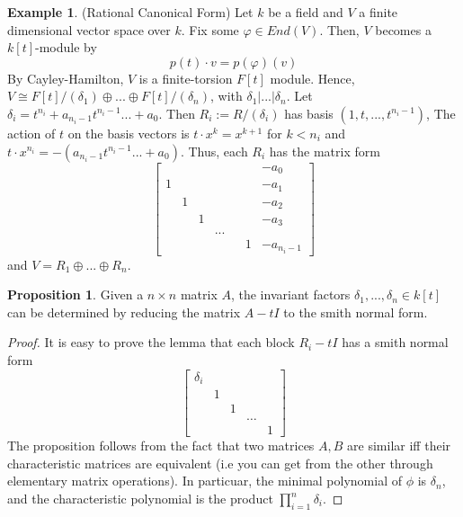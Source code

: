 \documentclass{article}
\theoremstyle{definition}
\theoremstyle{definition}
\theoremstyle{definition}
\newtheorem{proposition}{Proposition}[section]
\theoremstyle{definition}
\theoremstyle{definition}
\theoremstyle{definition}
\theoremstyle{definition}
\newtheorem{example}{Example}[section]
\begin{document}
\begin{tcolorbox}[colback=yellow!5!white,colframe=yellow!30!white]
\begin{example}
    (Rational Canonical Form) Let $k$ be a field and $V$ a finite dimensional vector space over $k$. Fix some $\varphi\in End(V)$. Then, $V$ becomes a $k[t]$-module by 
    \[p(t)\cdot v=p(\varphi)(v)\]
     By Cayley-Hamilton, $V$ is a finite-torsion $F[t]$ module.  Hence, $V\cong F[t]/(\delta_1)\oplus...\oplus F[t]/(\delta_n)$, with $\delta_1|...|\delta_n$. Let $\delta_i=t^{n_i}+a_{n_i-1}t^{n_i-1}...+a_0$. Then $R_i:=R/(\delta_i)$ has basis $(1,t,...,t^{n_i-1}) $, The action of $t$ on the basis vectors is $t\cdot x^k= x^{k+1}$ for $k<n_i$ and $t\cdot x^{n_i}= -(a_{n_i-1}t^{n_i-1}...+a_0)$. Thus, each $R_i$ has the matrix form
     \[
     \begin{bmatrix}
     &&&&&&-a_0\\
     1&&&&&&-a_1\\
    &1&&&&& -a_2\\
    &&1&&&& -a_3\\
    &&&...\\
    &&&&&1& -a_{n_i-1}
     \end{bmatrix}\]
     and $V=R_1\oplus ...\oplus R_n$.
\end{example}
\end{tcolorbox}
 

\begin{tcolorbox}[colback=blue!5!white,colframe=blue!30!white]
\begin{proposition}
Given a $n\times n$ matrix $A$, the invariant factors $\delta_1,...,\delta_n\in k[t]$ can be determined by reducing the matrix $A-tI$ to the smith normal form.   
\end{proposition}
\end{tcolorbox}
\begin{proof}
    It is easy to prove the lemma that each block $R_i-tI$ has a smith normal form \[
    \begin{bmatrix}
    \delta_i\\
    &1\\
    &&1\\
    &&&\dots \\
    &&&&1
    \end{bmatrix}\]
    The proposition follows from the fact that two matrices $A,B$ are similar iff their characteristic matrices are equivalent (i.e you can get from the other through elementary matrix operations). In particuar, the minimal polynomial of $\phi$ is $\delta_n$, and the characteristic polynomial is the product $\prod_{i=1}^{n}\delta_i$.
\end{proof}
\end{document}
